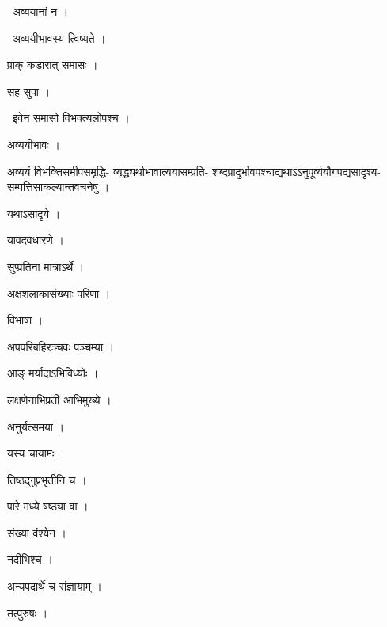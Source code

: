 \documentclass[10pt, openany, oneside]{book}
\begin{document}
\par\noindent\hspace{1.5em}{\vps वा॰}~{\qt अव्ययानां न ।}

\par\noindent\hspace{1.5em}{\vps वा॰}~{\qt अव्ययीभावस्य त्विष्यते ।}

\noindent प्राक् कडारात् समासः ।

\noindent सह सुपा ।

\par\noindent\hspace{1.5em}{\vps वा॰}~{\qt इवेन समासो विभक्त्यलोपश्च ।}

\noindent अव्ययीभावः ।

\noindent अव्ययं विभक्तिसमीपसमृद्धि- व्यृद्ध्यर्थाभावात्ययासम्प्रति- शब्दप्रादुर्भावपश्चाद्यथाऽऽनुपूर्व्ययौगपद्यसादृश्य- सम्पत्तिसाकल्यान्तवचनेषु ।

\noindent यथाऽसादृये ।

\noindent यावदवधारणे ।

\noindent सुप्प्रतिना मात्राऽर्थे ।

\noindent अक्षशलाकासंख्याः परिणा ।

\noindent विभाषा ।

\noindent अपपरिबहिरञ्चवः पञ्चम्या ।

\noindent आङ् मर्यादाऽभिविध्योः ।

\noindent लक्षणेनाभिप्रती आभिमुख्ये ।

\noindent अनुर्यत्समया ।

\noindent यस्य चायामः ।

\noindent तिष्ठद्गुप्रभृतीनि च ।

\noindent पारे मध्ये षष्ठ्या वा ।

\noindent संख्या वंश्येन ।

\noindent नदीभिश्च ।

\noindent अन्यपदार्थे च संज्ञायाम् ।

\noindent तत्पुरुषः ।
\end{document}
